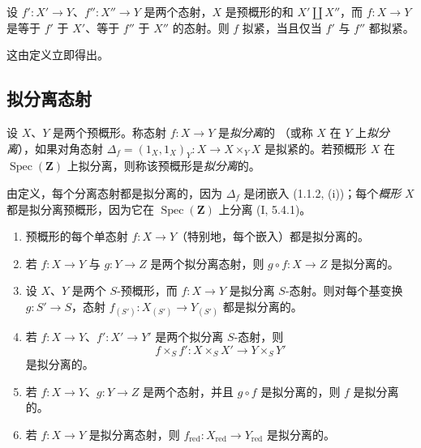 \begin{proposition}[1.1.6]
\label{IV.1.1.6-fr}
设 $f':X'\to Y$、$f'':X''\to Y$ 是两个态射，$X$ 是预概形的和
$X'\coprod X''$，而 $f:X\to Y$ 是等于 $f'$ 于 $X'$、等于 $f''$ 于 $X''$
的态射。则 $f$ 拟紧，当且仅当 $f'$ 与 $f''$ 都拟紧。
\end{proposition}

这由定义立即得出。

\subsection{拟分离态射}
\label{subsection:IV.1.2-fr}

\begin{definition}[1.2.1]
\label{IV.1.2.1-fr}
设 $X$、$Y$ 是两个预概形。称态射 $f:X\to Y$ 是\emph{拟分离}的
（或称 $X$ 在 $Y$ 上\emph{拟分离}），如果对角态射
$\Delta_f=(1_X,1_X)_Y:X\to X\times_Y X$ 是拟紧的。若预概形 $X$ 在
$\operatorname{Spec}(\mathbf Z)$ 上拟分离，则称该预概形是\emph{拟分离}的。
\end{definition}

由定义，每个分离态射都是拟分离的，因为 $\Delta_f$ 是闭嵌入
(1.1.2, (i))；每个\emph{概形} $X$ 都是拟分离预概形，因为它在
$\operatorname{Spec}(\mathbf Z)$ 上分离 (I, 5.4.1)。

\begin{proposition}[1.2.2]
\label{IV.1.2.2-fr}
\begin{enumerate}
  \item[(i)] 预概形的每个单态射 $f:X\to Y$（特别地，每个嵌入）都是拟分离的。
  \item[(ii)] 若 $f:X\to Y$ 与 $g:Y\to Z$ 是两个拟分离态射，则
  $g\circ f:X\to Z$ 是拟分离的。
  \item[(iii)] 设 $X$、$Y$ 是两个 $S$-预概形，而 $f:X\to Y$ 是拟分离
  $S$-态射。则对每个基变换 $g:S'\to S$，态射
  $f_{(S')}:X_{(S')}\to Y_{(S')}$ 都是拟分离的。
  \item[(iv)] 若 $f:X\to Y$、$f':X'\to Y'$ 是两个拟分离 $S$-态射，则
  \[
    f\times_S f':X\times_S X'\to Y\times_S Y'
  \]
  是拟分离的。
  \item[(v)] 若 $f:X\to Y$、$g:Y\to Z$ 是两个态射，并且 $g\circ f$
  是拟分离的，则 $f$ 是拟分离的。
  \item[(vi)] 若 $f:X\to Y$ 是拟分离态射，则
  $f_{\mathrm{red}}:X_{\mathrm{red}}\to Y_{\mathrm{red}}$ 是拟分离的。
\end{enumerate}
\end{proposition}

